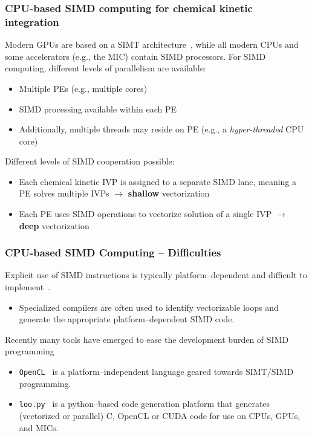 \documentclass{beamer}
\begin{document}
    
\begin{frame}
 \frametitle{CPU-based SIMD computing for chemical kinetic integration}
 Modern GPUs are based on a SIMT architecture~, while all modern CPUs and some accelerators (e.g., the MIC) contain SIMD processors.
 For SIMD computing, different levels of parallelism are available:
 \begin{itemize}
  \item Multiple PEs (e.g., multiple cores)
  \item SIMD processing available within each PE
  \item Additionally, multiple threads may reside on PE (e.g., a \textit{hyper-threaded} CPU core)
 \end{itemize}
 Different levels of SIMD cooperation possible:
 \begin{itemize}
  \item Each chemical kinetic IVP is assigned to a separate SIMD lane, meaning a PE solves multiple IVPs $\rightarrow$ \textbf{shallow} vectorization
  \item Each PE uses SIMD operations to vectorize solution of a single IVP $\rightarrow$ \textbf{deep} vectorization
 \end{itemize}
\end{frame}

\begin{frame}
  \frametitle{CPU-based SIMD Computing -- Difficulties}
  Explicit use of SIMD instructions is typically platform--dependent and difficult to implement~.
  \begin{itemize}
   \item Specialized compilers are often used to identify vectorizable loops and generate the appropriate platform--dependent SIMD code.
  \end{itemize}
  Recently many tools have emerged to ease the development burden of SIMD programming
  \begin{itemize}
   \item \texttt{OpenCL}~ is a platform--independent language geared towards SIMT\slash SIMD programming.
   \item \texttt{loo.py}~ is a python--based code generation platform that generates (vectorized or parallel) C, OpenCL or CUDA code for use on CPUs, GPUs, and MICs.
  \end{itemize}
\end{frame}
\end{document}
